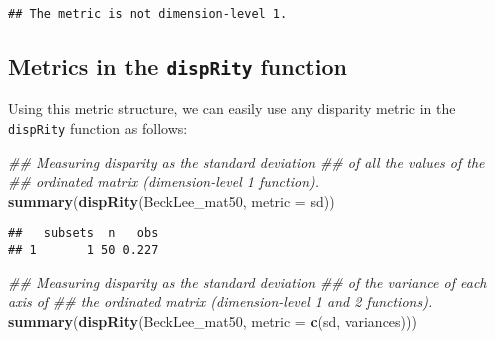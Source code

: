 \documentclass[
]{book}
\newenvironment{Shaded}{\begin{snugshade}}{\end{snugshade}}
\newcommand{\CommentTok}[1]{\textcolor[rgb]{0.56,0.35,0.01}{\textit{#1}}}
\newcommand{\ControlFlowTok}[1]{\textcolor[rgb]{0.13,0.29,0.53}{\textbf{#1}}}
\newcommand{\DataTypeTok}[1]{\textcolor[rgb]{0.13,0.29,0.53}{#1}}
\newcommand{\KeywordTok}[1]{\textcolor[rgb]{0.13,0.29,0.53}{\textbf{#1}}}
\newcommand{\NormalTok}[1]{#1}
\newcommand{\OperatorTok}[1]{\textcolor[rgb]{0.81,0.36,0.00}{\textbf{#1}}}
\newcommand{\OtherTok}[1]{\textcolor[rgb]{0.56,0.35,0.01}{#1}}
\newcommand{\StringTok}[1]{\textcolor[rgb]{0.31,0.60,0.02}{#1}}
\begin{document}
\begin{Shaded}
\end{Shaded}

\begin{verbatim}
## The metric is not dimension-level 1.
\end{verbatim}

\hypertarget{metrics-in-the-disprity-function}{%
\subsection{\texorpdfstring{Metrics in the \texttt{dispRity} function}{Metrics in the dispRity function}}\label{metrics-in-the-disprity-function}}

Using this metric structure, we can easily use any disparity metric in the \texttt{dispRity} function as follows:

\begin{Shaded}
\begin{Highlighting}[]
\CommentTok{\#\# Measuring disparity as the standard deviation}
\CommentTok{\#\# of all the values of the}
\CommentTok{\#\# ordinated matrix (dimension{-}level 1 function).}
\KeywordTok{summary}\NormalTok{(}\KeywordTok{dispRity}\NormalTok{(BeckLee\_mat50, }\DataTypeTok{metric =}\NormalTok{ sd))}
\end{Highlighting}
\end{Shaded}

\begin{verbatim}
##   subsets  n   obs
## 1       1 50 0.227
\end{verbatim}

\begin{Shaded}
\begin{Highlighting}[]
\CommentTok{\#\# Measuring disparity as the standard deviation}
\CommentTok{\#\# of the variance of each axis of}
\CommentTok{\#\# the ordinated matrix (dimension{-}level 1 and 2 functions).}
\KeywordTok{summary}\NormalTok{(}\KeywordTok{dispRity}\NormalTok{(BeckLee\_mat50, }\DataTypeTok{metric =} \KeywordTok{c}\NormalTok{(sd, variances)))}
\end{Highlighting}
\end{Shaded}
\end{document}
